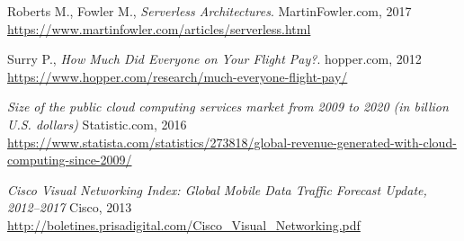 \documentclass[oneside]{mgr}
\begin{document}
\begin{thebibliography}{99}
	Roberts M., Fowler M., \emph{Serverless Architectures}.
	MartinFowler.com, 2017
	\url{https://www.martinfowler.com/articles/serverless.html}

	Surry P., \emph{How Much Did Everyone on Your Flight Pay?}.
	hopper.com, 2012
	\url{https://www.hopper.com/research/much-everyone-flight-pay/}

	\emph{Size of the public cloud computing services market from 2009 to 2020 (in billion U.S. dollars)}
	Statistic.com, 2016
	\url{https://www.statista.com/statistics/273818/global-revenue-generated-with-cloud-computing-since-2009/}

	\emph{Cisco Visual Networking Index: Global Mobile Data Traffic Forecast Update, 2012–2017 }
	Cisco, 2013
	\url{http://boletines.prisadigital.com/Cisco_Visual_Networking.pdf}


\end{thebibliography}
\end{document}
